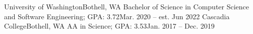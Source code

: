 \resumeSubHeadingListStart
    \resumeSubheading
      {University of Washington}{Bothell, WA}
      {Bachelor of Science in Computer Science and Software Engineering;  GPA: 3.72}{Mar. 2020 -- est. Jun 2022}
    \resumeSubheading
      {Cascadia College}{Bothell, WA}
      {AA in Science;  GPA: 3.53}{Jan. 2017 -- Dec. 2019}
\resumeSubHeadingListEnd